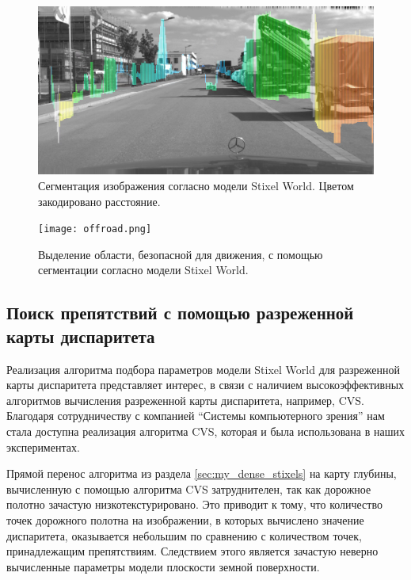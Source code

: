 \documentclass[aps,%
14pt,%
final,%
oneside,
onecolumn,%
musixtex, %
superscriptaddress,%
centertags]{extarticle} %
\begin{document}
\begin{figure}[H]
\centering
\includegraphics[width=\textwidth]{small_object.png}
\caption{Сегментация изображения согласно модели Stixel World. Цветом закодировано расстояние.}
\label{fig:stix_small}
\end{figure}

\begin{figure}[H]
\centering
\texttt{[image: offroad.png]}
\caption{Выделение области, безопасной для движения, с помощью сегментации согласно модели Stixel World.}
\label{fig:stix_offroad}
\end{figure}

\newpage

\subsection{Поиск препятствий с помощью разреженной карты диспаритета}\label{sec:my_sparse_stixels}

Реализация алгоритма подбора параметров модели Stixel World для разреженной карты диспаритета представляет интерес, в связи с наличием высокоэффективных алгоритмов вычисления разреженной карты диспаритета, например, CVS\cite{cvs}. Благодаря сотрудничеству с компанией ``Системы компьютерного зрения'' нам стала доступна реализация алгоритма CVS, которая и была использована в наших экспериментах.

Прямой перенос алгоритма из раздела \ref{sec:my_dense_stixels} на карту глубины, вычисленную с помощью алгоритма CVS затруднителен, так как дорожное полотно зачастую низкотекстурировано. Это приводит к тому, что количество точек дорожного полотна на изображении, в которых вычислено значение диспаритета, оказывается небольшим по сравнению с количеством точек, принадлежащим препятствиям. Следствием этого является зачастую неверно вычисленные параметры модели плоскости земной поверхности.
\end{document}
